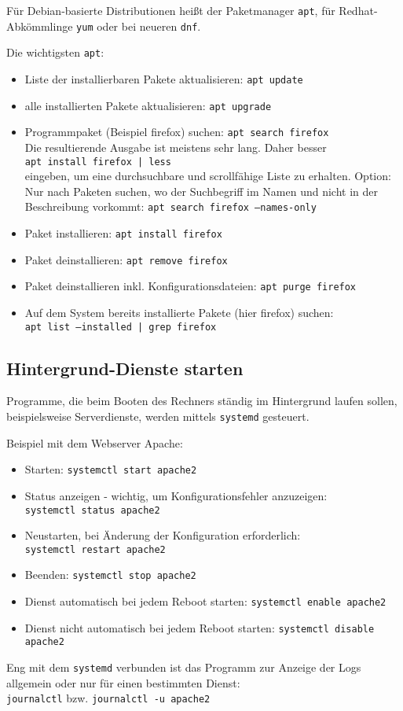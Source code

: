 \documentclass[11pt]{article}
\begin{document}
Für Debian-basierte Distributionen heißt der Paketmanager \texttt{apt}, für Redhat-Abkömmlinge \texttt{yum} oder bei neueren \texttt{dnf}.

Die wichtigsten \texttt{apt}:
\begin{itemize}
  \item Liste der installierbaren Pakete aktualisieren: \texttt{apt update}
  \item alle installierten Pakete aktualisieren: \texttt{apt upgrade}
  \item Programmpaket (Beispiel firefox) suchen:  \texttt{apt search firefox}\\
  Die resultierende Ausgabe ist meistens sehr lang. Daher besser \\ 
  \texttt{apt install firefox | less} \\
  eingeben, um eine durchsuchbare und scrollfähige Liste zu erhalten. Option: Nur nach Paketen suchen, wo der Suchbegriff im Namen und nicht in der Beschreibung vorkommt: \texttt{apt search firefox --names-only} 
  \item Paket installieren: \texttt{apt install firefox}
  \item Paket deinstallieren: \texttt{apt remove firefox}
  \item Paket deinstallieren inkl. Konfigurationsdateien: \texttt{apt purge firefox }
  \item Auf dem System bereits installierte Pakete (hier firefox) suchen:\\
  \texttt {apt list --installed | grep firefox}
\end{itemize}

\subsection{Hintergrund-Dienste starten}
Programme, die beim Booten des Rechners ständig im Hintergrund laufen sollen, beispielsweise Serverdienste, werden mittels \texttt{systemd} gesteuert.

Beispiel mit dem Webserver Apache:
\begin{itemize}
  \item Starten: \texttt{systemctl start apache2}
  \item Status anzeigen - wichtig, um Konfigurationsfehler anzuzeigen:\\ \texttt{systemctl status apache2}
  \item Neustarten, bei Änderung der Konfiguration erforderlich:\\
   \texttt{systemctl restart apache2}
  \item Beenden: \texttt{systemctl stop apache2}
  \item Dienst automatisch bei jedem Reboot starten: \texttt{systemctl enable apache2}
  \item Dienst nicht automatisch bei jedem Reboot starten: \texttt{systemctl disable apache2}
\end{itemize}
Eng mit dem \texttt{systemd} verbunden ist das Programm zur Anzeige der Logs allgemein oder nur für einen bestimmten Dienst:\\
\texttt{journalctl} bzw.  \texttt{journalctl -u apache2}
\end{document}
